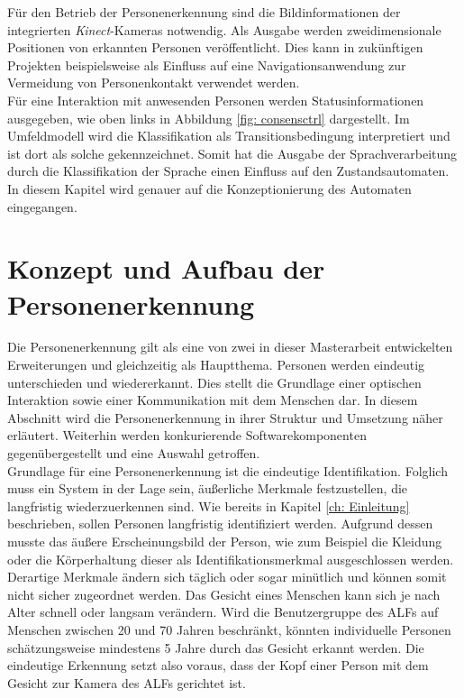 	Für den Betrieb der Personenerkennung sind die Bildinformationen der integrierten \textit{Kinect}-Kameras notwendig. Als Ausgabe werden zweidimensionale Positionen von erkannten Personen veröffentlicht. Dies kann in zukünftigen Projekten beispielsweise als Einfluss auf eine Navigationsanwendung zur Vermeidung von Personenkontakt verwendet werden.\\
	
	
	
	Für eine Interaktion mit anwesenden Personen werden Statusinformationen ausgegeben, wie oben links in Abbildung \ref{fig: consensctrl} dargestellt. Im Umfeldmodell wird die Klassifikation als Transitionsbedingung interpretiert und ist dort als solche gekennzeichnet. Somit hat die Ausgabe der Sprachverarbeitung durch die Klassifikation der Sprache einen Einfluss auf den Zustandsautomaten. In diesem Kapitel wird genauer auf die Konzeptionierung des Automaten eingegangen.\\
		

	
	
	
	\section{Konzept und Aufbau der Personenerkennung}
	\label{sec: Konzept Personenerkennung}
	
	Die Personenerkennung gilt als eine von zwei in dieser Masterarbeit entwickelten Erweiterungen und gleichzeitig als Hauptthema. Personen werden eindeutig unterschieden und wiedererkannt. Dies stellt die Grundlage einer optischen Interaktion sowie einer Kommunikation mit dem Menschen dar. In diesem Abschnitt wird die Personenerkennung in ihrer Struktur und Umsetzung näher erläutert. Weiterhin werden konkurierende Softwarekomponenten gegenübergestellt und eine Auswahl getroffen.\\
	
	Grundlage für eine Personenerkennung ist die eindeutige Identifikation. Folglich muss ein System in der Lage sein, äußerliche Merkmale festzustellen, die langfristig wiederzuerkennen sind. Wie bereits in Kapitel \ref{ch: Einleitung} beschrieben, sollen Personen langfristig identifiziert werden. Aufgrund dessen musste das äußere Erscheinungsbild der Person, wie zum Beispiel die Kleidung oder die Körperhaltung dieser als Identifikationsmerkmal ausgeschlossen werden. Derartige Merkmale ändern sich täglich oder sogar minütlich und können somit nicht sicher zugeordnet werden. Das Gesicht eines Menschen kann sich je nach Alter schnell oder langsam verändern. Wird die Benutzergruppe des ALFs auf Menschen zwischen 20 und 70 Jahren beschränkt, könnten individuelle Personen schätzungsweise mindestens 5 Jahre durch das Gesicht erkannt werden. Die eindeutige Erkennung setzt also voraus, dass der Kopf einer Person mit dem Gesicht zur Kamera des ALFs gerichtet ist. \\ 
	
